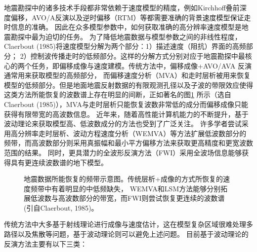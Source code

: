 地震勘探中的诸多技术手段都非常依赖于速度模型的精度，例如Kirchhoff叠前深度偏移，AVO/A反演以及逆时偏移（RTM）等都需要准确的背景速度模型保证走时信息的准确。
因此在众多模型参数中，如何获取准确的高分辨率速度模型是地震勘探中最为迫切的任务。
为了降低地震数据与模型参数之间的非线性程度，Claerbout (1985)\cite{Claerbout1985Imaging}将速度模型分解为两个部分：1）描述速度（阻抗）界面的高频部分；
2）控制波传播走时的低频部分。这样的分解方式分别对应于地震勘探中最核心的两个任务，即偏移成像与速度建模。传统方法中，偏移成像+AVO/AVA
反演通常用来获取模型的高频部分，
而偏移速度分析（MVA）和走时层析被用来恢复模型的低频部分。但是地面地震反射数据的有限观测孔径以及子波的带限效应使得
这类方法所能恢复的波数谱上存在明显的间断，正如著名的图\ref{fig:GapInSeisVel}
所示（选自Claerbout (1985)\cite{Claerbout1985Imaging}），MVA与走时层析只能恢复波数非常低的成分而偏移成像只能获得有限带宽的高波数信息。
近年来，随着高性能计算机能力的不断提升，基于波动理论来获取模型高、低波数成分的方法也受到了广泛关注。
许多学者尝试采用高分辨率走时层析、波动方程速度分析（WEMVA）等方法扩展低波数部分的频带，而高波数部分则采用真振幅和最小平方偏移方法来获取更高精度和更宽波数范围的结果。
同时，更具潜力的全波形反演方法（FWI）采用全波场信息能够获得具有更连续波数谱的地下模型。
\begin{figure}[!htb] 
   \centering 
   \caption{地震数据所能恢复的频带示意图。传统层析+成像的方式所恢复的速度频带中有着明显的中低频缺失，
	   WEMVA和LSM方法能够分别拓展低波数与高波数部分的带宽，而FWI则尝试恢复更连续的波数谱(引自Claerbout, 1985\cite{Claerbout1985Imaging})。}
   \label{fig:GapInSeisVel}
\end{figure}

传统方法中大多基于射线理论进行成像与速度估计，这在模型复杂区域很难处理多路径以及焦散等问题，基于波动理论则可以避免上述问题。
目前基于波动理论的反演方法主要有以下三类：

